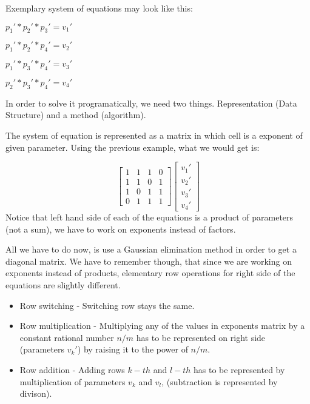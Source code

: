 \documentclass{article}
\begin{document}
Exemplary system of equations may look like this:

$p_1'*p_2'*p_3' = v_1'$

$p_1'*p_2'*p_4' = v_2'$

$p_1'*p_3'*p_4' = v_3'$

$p_2'*p_3'*p_4' = v_4'$

In order to solve it programatically, we need two things. Representation (Data Structure) and a method (algorithm).

The system of equation is represented as a matrix in which cell is a exponent of given parameter. Using the previous example, what we would get is:

\begin{equation*}

\left[\begin{array}{cccc}1&1&1&0\\1&1&0&1\\1&0&1&1\\0&1&1&1\end{array}\right]

\left[\begin{array}{c}v_1'\\v_2'\\v_3'\\v_4'\end{array}\right]

\end{equation*}
Notice that left hand side of each of the equations is a product of parameters (not a sum), we have to work on exponents instead of factors.

All we have to do now, is use a Gaussian elimination method in order to get a diagonal matrix.
We have to remember though, that since we are working on exponents instead of products, elementary row operations for right side of the equations are slightly different.
\begin{itemize}
    \item Row switching - Switching row stays the same.
    \item Row multiplication - Multiplying any of the values in exponents matrix by a constant rational number $n/m$ has to be represented on right side (parameters $v_k'$) by raising it to the power of $n/m$.
    \item Row addition - Adding rows $k-th$ and $l-th$ has to be represented by multiplication of parameters $v_k$ and $v_l$, (subtraction is represented by divison).
\end{itemize}
\end{document}

